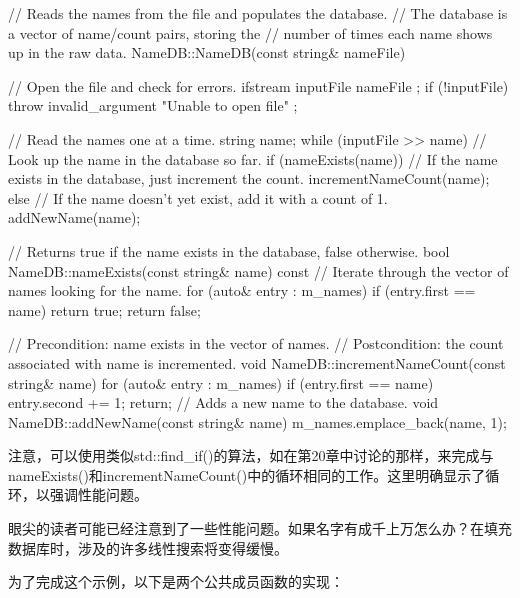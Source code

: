 \begin{cpp}
// Reads the names from the file and populates the database.
// The database is a vector of name/count pairs, storing the
// number of times each name shows up in the raw data.
NameDB::NameDB(const string& nameFile)
{
    // Open the file and check for errors.
    ifstream inputFile { nameFile };
    if (!inputFile) {
        throw invalid_argument { "Unable to open file" };
    }

    // Read the names one at a time.
    string name;
    while (inputFile >> name) {
        // Look up the name in the database so far.
        if (nameExists(name)) {
            // If the name exists in the database, just increment the count.
            incrementNameCount(name);
        } else {
            // If the name doesn't yet exist, add it with a count of 1.
            addNewName(name);
        }
    }
}

// Returns true if the name exists in the database, false otherwise.
bool NameDB::nameExists(const string& name) const
{
    // Iterate through the vector of names looking for the name.
    for (auto& entry : m_names) {
        if (entry.first == name) {
            return true;
        }
    }
    return false;
}

// Precondition: name exists in the vector of names.
// Postcondition: the count associated with name is incremented.
void NameDB::incrementNameCount(const string& name)
{
    for (auto& entry : m_names) {
        if (entry.first == name) {
            entry.second += 1;
            return;
        }
    }
}
// Adds a new name to the database.
void NameDB::addNewName(const string& name)
{
    m_names.emplace_back(name, 1);
}
\end{cpp}

注意，可以使用类似std::find\_if()的算法，如在第20章中讨论的那样，来完成与nameExists()和incrementNameCount()中的循环相同的工作。这里明确显示了循环，以强调性能问题。

眼尖的读者可能已经注意到了一些性能问题。如果名字有成千上万怎么办？在填充数据库时，涉及的许多线性搜索将变得缓慢。

为了完成这个示例，以下是两个公共成员函数的实现：

